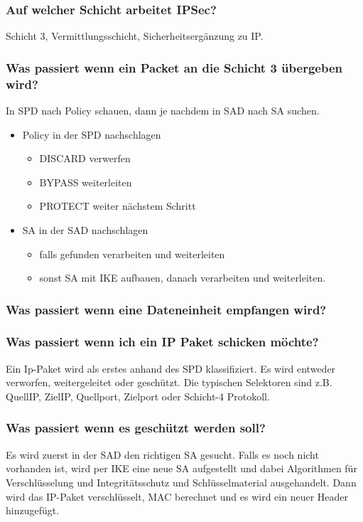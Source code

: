 	\subsubsection{Auf welcher Schicht arbeitet IPSec?}
	Schicht 3, Vermittlungsschicht, Sicherheitsergänzung zu IP.
	
	\subsubsection{Was passiert wenn ein Packet an die Schicht 3 übergeben wird?}
	In SPD nach Policy schauen, dann je nachdem in SAD nach SA suchen.
	
	\begin{itemize}
		\item Policy in der SPD nachschlagen
			\begin{itemize}
				\item DISCARD verwerfen
				\item BYPASS weiterleiten
				\item PROTECT weiter nächstem Schritt
			\end{itemize}
		\item SA in der SAD nachschlagen
			\begin{itemize}
				\item falls gefunden verarbeiten und weiterleiten
				\item sonst SA mit IKE aufbauen, danach verarbeiten und weiterleiten.
			\end{itemize}
	\end{itemize}

	\subsubsection{Was passiert wenn eine Dateneinheit empfangen wird?}

	
	\subsubsection{Was passiert wenn ich ein IP Paket schicken möchte?}
	Ein Ip-Paket wird als erstes anhand des SPD klassifiziert. Es wird entweder verworfen, weitergeleitet oder geschützt. Die typischen Selektoren sind z.B. QuellIP, ZielIP, Quellport, Zielport oder Schicht-4 Protokoll.

	\subsubsection{Was passiert wenn es geschützt werden soll?}
	Es wird zuerst in der SAD den richtigen SA gesucht. Falls es noch nicht vorhanden ist, wird per IKE eine neue SA aufgestellt und dabei Algorithmen für Verschlüsselung und Integritätsschutz und Schlüsselmaterial ausgehandelt. Dann wird das IP-Paket verschlüsselt, MAC berechnet und es wird ein neuer Header hinzugefügt.
	

